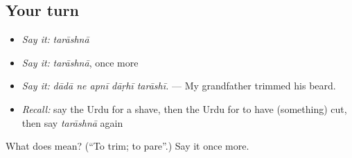 \subsection*{Your turn}
\begin{itemize}
\raggedright
  \item \emph{Say it:} \emph{tarāshnā}
  \item \emph{Say it:} \emph{tarāshnā}, once more
  \item \emph{Say it:} \emph{dādā ne apnī dāṛhī tarāshī.} — My grandfather trimmed his beard.
  \item \emph{Recall:} say the Urdu for a shave, then the Urdu for to have (something) cut, then say \emph{tarāshnā} again
\end{itemize}

\begin{tcolorbox}[breakable,colback=teal!4,colframe=teal!35!black,title={Before you move on}]
What does  mean? (\textquotedblleft{}To trim; to pare\textquotedblright{}.) Say it once more.
\end{tcolorbox}
